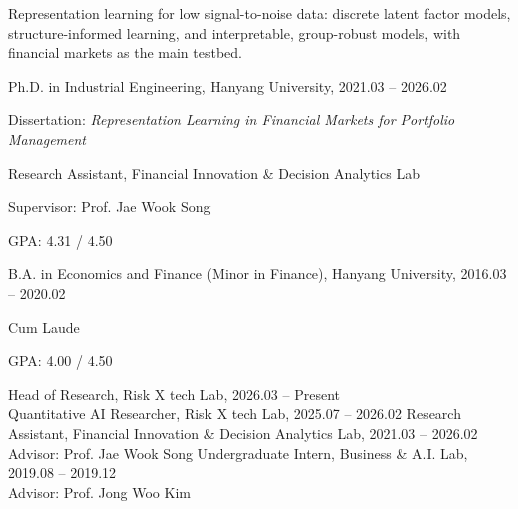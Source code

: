 \documentclass[11pt]{article}
\begin{document}
\cvheader

\begin{ind}
Representation learning for low signal-to-noise data: discrete latent factor models, structure-informed learning, and interpretable, group-robust models, with financial markets as the main testbed.
\end{ind}

\begin{blist}
\item Ph.D. in Industrial Engineering, Hanyang University, 2021.03 – 2026.02
  \begin{dlist}
  \item Dissertation: \textit{Representation Learning in Financial Markets for Portfolio Management}
  \item Research Assistant, Financial Innovation \& Decision Analytics Lab
  \item Supervisor: Prof. Jae Wook Song
  \item GPA: 4.31 / 4.50
  \end{dlist}
\item B.A. in Economics and Finance (Minor in Finance), Hanyang University, 2016.03 – 2020.02
  \begin{dlist}
  \item Cum Laude
  \item GPA: 4.00 / 4.50
  \end{dlist}
\end{blist}

\begin{ind}
Head of Research, Risk X tech Lab, 2026.03 – Present\\
Quantitative AI Researcher, Risk X tech Lab, 2025.07 – 2026.02
\gap
{}
Research Assistant, Financial Innovation \& Decision Analytics Lab, 2021.03 – 2026.02\\
Advisor: Prof. Jae Wook Song
\gap
{}
Undergraduate Intern, Business \& A.I. Lab, 2019.08 – 2019.12\\
Advisor: Prof. Jong Woo Kim
\end{ind}
\end{document}

